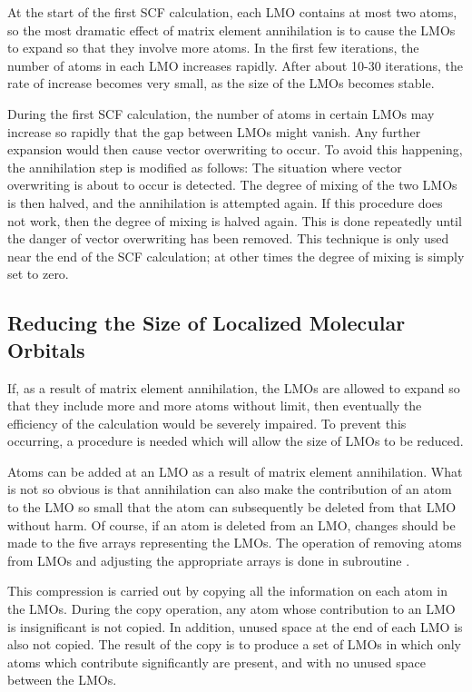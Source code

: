 At the start of the first SCF calculation, each LMO contains at most two atoms,
so the most dramatic effect of matrix element annihilation is to cause the
LMOs to expand so that they involve more atoms.  In the first few iterations,
the number of atoms in each LMO increases rapidly.  After about 10-30 iterations,
the rate of increase becomes very small, as the size of the LMOs becomes stable.

During the first SCF calculation, the number of atoms in certain LMOs may 
increase so rapidly that the gap between LMOs might vanish.  Any further
expansion would then cause vector overwriting to occur.  To avoid this
happening, the annihilation step is modified as follows:
The situation where vector overwriting is about to occur is detected.  The
degree of mixing of the two LMOs is then halved, and the annihilation is attempted
again.  If this procedure does not work, then the degree of mixing 
is halved again.  This
is done repeatedly until the danger of vector overwriting has been removed.
This technique is only used near the end of the SCF calculation; at other
times the degree of mixing is simply set to zero.

\subsection{Reducing the Size of Localized Molecular Orbitals}
If, as a result of matrix element annihilation,  the LMOs are allowed  to
expand so that they include more and more atoms without limit, then  eventually
the efficiency of the calculation would be severely impaired. To prevent this
occurring, a procedure is needed which will allow the size  of LMOs to be
reduced.  

Atoms can be added at an LMO as a result of matrix element annihilation. What
is not so obvious is that  annihilation can also make the contribution of an
atom to the LMO so small that the atom can subsequently be deleted from that
LMO without harm. Of course, if an atom is deleted from an LMO, changes should
be made to the  five arrays representing the LMOs.  The operation of removing
atoms from LMOs and adjusting the  appropriate arrays is done in subroutine
.

This compression is carried out by copying all the information on each atom in
the LMOs.  During the copy operation, any atom whose contribution to an LMO is
insignificant is  not copied.  In addition, unused space at the end of each LMO
is also not copied.  The result of the copy is to produce a set of LMOs in
which only atoms which contribute significantly are present, and with no unused
space between the LMOs. 

